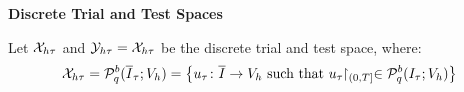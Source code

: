 \begin{frame}
    \vspace*{\fill}

    \begin{center}
        {\color{\accentcolor} \Large \textbf{Discrete Trial and Test Spaces}}
        \vspace*{0.25cm}

        \begin{minipage}{0.75\textwidth}
            \begin{definition}
                Let $\mathcal{X}_{h \tau}$ and $\mathcal{Y}_{h \tau} = \mathcal{X}_{h \tau} $ be the discrete trial and test space, where:
                \begin{align*}
                    \mathcal{X}_{h \tau} &= \mathcal{P}_{q}^b(\overline{I}_{\tau}; V_h) = \left\{ u_{\tau} \colon \overline{I} \rightarrow V_h \text{ such that } u_{\tau} \!\!\restriction_{(0, T]} \in \mathcal{P}_{q}^b(I_{\tau}; V_h) \right\} \\ 
                \end{align*}
            \end{definition}
        \end{minipage}
    \end{center}
    \vspace*{\fill}
    
\end{frame}

